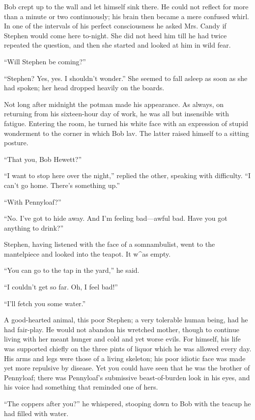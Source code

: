 Bob crept up to the wall and let himself sink there. He could not
reflect for more than a minute or two continuously; his brain then
became a mere confused whirl. In one of the intervals of his perfect
consciousness he asked Mrs. Candy if Stephen would come here to-night.
She did not heed him till he had twice repeated the question, and then
she started and looked at him in wild fear.

``Will Stephen be coming?''

``Stephen? Yes, yes. I shouldn't wonder.'' She seemed to fall asleep as
soon as she had spoken; her head dropped heavily on the boards.

Not long after midnight the potman made his appearance. As always, on
returning from his sixteen-hour day of work, he was all but insensible
with fatigue. Entering the room, he turned his white face with an
expression of stupid wonderment to the corner in which Bob lav. The
latter raised himself to a sitting posture.

{}``That you, Bob Hewett?''

``I want to stop here over the night,'' replied the other, speaking with
difficulty. ``I can't go home. There's something up.''

``With Pennyloaf?''

``No. I've got to hide away. And I'm feeling bad---awful bad. Have you
got anything to drink?''

Stephen, having listened with the face of a somnambulist, went to the
mantelpiece and looked into the teapot. It w\^{}as empty.

``You can go to the tap in the yard,'' he said.

``I couldn't get so far. Oh, I feel bad!''

``I'll fetch you some water.''

A good-hearted animal, this poor Stephen; a very tolerable human being,
had he had fair-play. He would not abandon his wretched mother, though
to continue living with her meant hunger and cold and yet worse evils.
For himself, his life was supported chiefly on the three pints of liquor
which he was allowed every day. His arms and legs were those of a living
skeleton; his poor idiotic face was made yet more repulsive by disease.
Yet you could have seen that he was the brother of Pennyloaf; there was
Pennyloaf's submissive {}beast-of-burden look in his eyes, and his voice
had something that reminded one of hers.

``The coppers after you?'' he whispered, stooping down to Bob with the
teacup he had filled with water.

